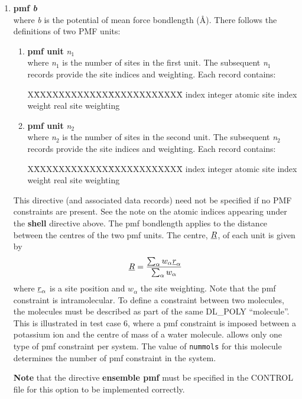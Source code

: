 \begin{enumerate}
\item{\bf pmf {\em b}}\\
where {\em b} is the potential of mean force bondlength (\AA). There 
follows the definitions of two PMF units:
\begin{enumerate}
\item{\bf pmf unit} {\em n}$_{1}$\\
where {\em n}$_{1}$ is the number of sites in the first unit. The
subsequent {\em n}$_{1}$ records provide the site indices and weighting.
Each record contains:
\begin{tabbing}
X\=XXXXXXXXXXXX\=XXXXXXXXXXXX\=\kill
\> index \> integer \> atomic site index\\
\> weight \> real \> site weighting\\
\end{tabbing}
\item{\bf pmf unit} {\em n}$_{2}$\\
where {\em n}$_{2}$ is the number of sites in the second  unit. The
subsequent {\em n}$_{2}$ records provide the site indices and weighting.
Each record contains:
\begin{tabbing}
X\=XXXXXXXXXXXX\=XXXXXXXXXXXX\=\kill
\> index \> integer \> atomic site index\\
\> weight \> real \> site weighting\\
\end{tabbing}
\end{enumerate}
This directive (and associated data records) need not be specified if
no PMF constraints are present.
See the note on the atomic indices appearing under the {\bf shell}
directive above. The pmf bondlength applies to the distance between the 
centres of the two pmf units. The centre, $\mbox{$\underline{R}$}$, of each unit is 
given by
\[ \mbox{$\underline{R}$} = {\sum_{\alpha} w_{\alpha} \mbox{$\underline{r}$}_{\alpha} \over \sum_{\alpha}
w_{\alpha}} \]
where $\mbox{$\underline{r}$}_{\alpha}$ is a site position and $w_{\alpha}$ the site
weighting.
Note that the pmf constraint is intramolecular. To define
a constraint between two molecules, the molecules must be described as part of
the same DL\_POLY ``molecule''.
This is illustrated in test case 6, where a pmf constraint
is imposed between a potassium ion and the centre of mass of a water molecule.
\D{} allows only one type of pmf constraint per system. The value of
{\tt nummols} for this molecule determines the number of pmf constraint
in the system.

{\bf Note} that the directive {\bf ensemble pmf} must be specified in the
CONTROL file for this option to be implemented correctly.



\end{enumerate}
